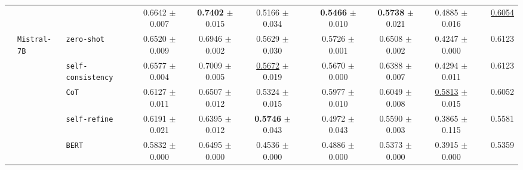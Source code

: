 \begin{table}[ht]
\begin{adjustbox}{max width=\textwidth}
\begin{tabular}{@{}l l l ccc p{0.15cm} ccc p{0.15cm} c@{}}
        & & \cellcolor{methodrow} \method{}                    & \cellcolor{methodrow} 0.6642 {\tiny$\pm$ 0.007} & \cellcolor{methodrow} \textbf{0.7402} {\tiny$\pm$ 0.015} & \cellcolor{methodrow} 0.5166 {\tiny$\pm$ 0.034}  & & \cellcolor{methodrow} \textbf{0.5466} {\tiny$\pm$ 0.010} & \cellcolor{methodrow} \textbf{0.5738} {\tiny$\pm$ 0.021} & \cellcolor{methodrow} 0.4885 {\tiny$\pm$ 0.016}  & & \cellcolor{avgall!85}\underline{0.6054} \\
        \cmidrule(lr){2-10}
        & \multirow{7}{*}{\texttt{Mistral-7B}}
          & \cellcolor{white} \texttt{zero-shot}               & \cellcolor{white} 0.6520 {\tiny$\pm$ 0.009} & \cellcolor{white} 0.6946 {\tiny$\pm$ 0.002} & \cellcolor{white} 0.5629 {\tiny$\pm$ 0.030}  & & \cellcolor{white} 0.5726 {\tiny$\pm$ 0.001} & \cellcolor{white} 0.6508 {\tiny$\pm$ 0.002} & \cellcolor{white} 0.4247 {\tiny$\pm$ 0.000}  & & \cellcolor{avgall!85}0.6123 \\
        & & \cellcolor{altrow} \texttt{self-consistency}       & \cellcolor{altrow} 0.6577 {\tiny$\pm$ 0.004} & \cellcolor{altrow} 0.7009 {\tiny$\pm$ 0.005} & \cellcolor{altrow} \underline{0.5672} {\tiny$\pm$ 0.019}  & & \cellcolor{altrow} 0.5670 {\tiny$\pm$ 0.000} & \cellcolor{altrow} 0.6388 {\tiny$\pm$ 0.007} & \cellcolor{altrow} 0.4294 {\tiny$\pm$ 0.011}  & & \cellcolor{avgall!85}0.6123 \\
        & & \cellcolor{white} \texttt{CoT}                    & \cellcolor{white} 0.6127 {\tiny$\pm$ 0.011} & \cellcolor{white} 0.6507 {\tiny$\pm$ 0.012} & \cellcolor{white} 0.5324 {\tiny$\pm$ 0.015}  & & \cellcolor{white} 0.5977 {\tiny$\pm$ 0.010} & \cellcolor{white} 0.6049 {\tiny$\pm$ 0.008} & \cellcolor{white} \underline{0.5813} {\tiny$\pm$ 0.015}  & & \cellcolor{avgall!85}0.6052 \\
        & & \cellcolor{altrow} \texttt{self-refine}            & \cellcolor{altrow} 0.6191 {\tiny$\pm$ 0.021} & \cellcolor{altrow} 0.6395 {\tiny$\pm$ 0.012} & \cellcolor{altrow} \textbf{0.5746} {\tiny$\pm$ 0.043}  & & \cellcolor{altrow} 0.4972 {\tiny$\pm$ 0.043} & \cellcolor{altrow} 0.5590 {\tiny$\pm$ 0.003} & \cellcolor{altrow} 0.3865 {\tiny$\pm$ 0.115}  & & \cellcolor{avgall!85}0.5581 \\
        & & \cellcolor{white} \texttt{BERT}                   & \cellcolor{white} 0.5832 {\tiny$\pm$ 0.000} & \cellcolor{white} 0.6495 {\tiny$\pm$ 0.000} & \cellcolor{white} 0.4536 {\tiny$\pm$ 0.000}  & & \cellcolor{white} 0.4886 {\tiny$\pm$ 0.000} & \cellcolor{white} 0.5373 {\tiny$\pm$ 0.000} & \cellcolor{white} 0.3915 {\tiny$\pm$ 0.000}  & & \cellcolor{avgall!85}0.5359 \\

\end{tabular}
\end{adjustbox}
\end{table}
